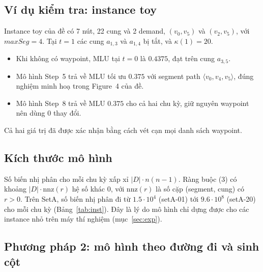 \documentclass[11pt,a4paper]{article}
\begin{document}
\subsection{Ví dụ kiểm tra: instance toy}

Instance toy của đề có 7 nút, 22 cung và 2 demand, $(v_0,v_5)$ và $(v_2,v_5)$, với $maxSeg=4$.
Tại $t=1$ các cung $a_{1,3}$ và $a_{1,4}$ bị tắt, và $\kappa(1)=20$.
\begin{itemize}
\item Khi không có waypoint, MLU tại $t=0$ là $0.4375$, đạt trên cung $a_{3,5}$.
\item Mô hình Step~5 trả về MLU tối ưu $0.375$ với segment path $\langle v_0,v_4,v_5\rangle$, đúng nghiệm minh hoạ trong Figure~4 của đề.
\item Mô hình Step~8 trả về MLU $0.375$ cho cả hai chu kỳ, giữ nguyên waypoint nên dùng 0 thay đổi.
\end{itemize}
Cả hai giá trị đã được xác nhận bằng cách vét cạn mọi danh sách waypoint.

\subsection{Kích thước mô hình}

Số biến nhị phân cho mỗi chu kỳ xấp xỉ $|D|\cdot n(n-1)$.
Ràng buộc (3) có khoảng $|D|\cdot\mathrm{nnz}(r)$ hệ số khác 0, với $\mathrm{nnz}(r)$ là số cặp (segment, cung) có $r>0$.
Trên SetA, số biến nhị phân đi từ $1.5\cdot10^4$ (setA-01) tới $9.6\cdot10^8$ (setA-20) cho mỗi chu kỳ (Bảng~\ref{tab:inst}).
Đây là lý do mô hình chỉ dựng được cho các instance nhỏ trên máy thí nghiệm (mục~\ref{sec:exp}).

\subsection{Phương pháp 2: mô hình theo đường đi và sinh cột}\label{sec:cg}
\end{document}
